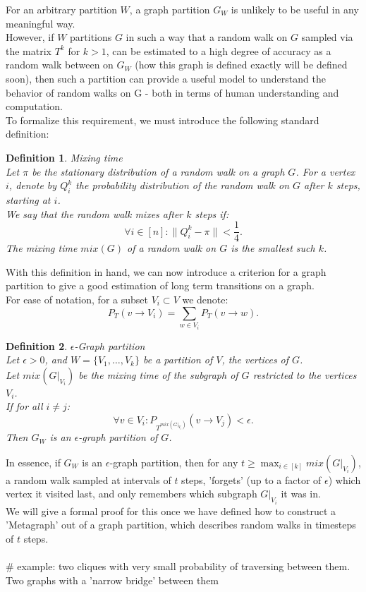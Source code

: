 \documentclass{article}
\newtheorem{definition}{Definition}
\begin{document}
For an arbitrary partition $W$, a graph partition $G_W$ is unlikely to be useful in any meaningful way. \\
However, if $W$ partitions $G$ in such a way that a random walk on $G$ sampled via the matrix $T^k$ for $k > 1$, can be estimated to a high degree of accuracy as a random walk between on $G_W$ (how this graph is defined exactly will be defined soon), then such a partition can provide a useful model to understand the behavior of random walks on G - both in terms of human understanding and computation.\\

To formalize this requirement, we must introduce the following standard definition:
\begin{definition}
    Mixing time\\
    Let $\pi$ be the stationary distribution of a random walk on a graph $G$. For a vertex $i$, denote by $Q_i^k$ the probability distribution of the random walk on $G$ after $k$ steps, starting at $i$.\\
    We say that the random walk mixes after $k$ steps if:
    \[
        \forall i \in [n] : \|Q_i^k - \pi\| < \frac{1}{4}
    .\] 
    The mixing time $mix(G)$ of a random walk on $G$ is the smallest such $k$.
\end{definition}

With this definition in hand, we can now introduce a criterion for a graph partition to give a good estimation of long term transitions on a graph.\\
For ease of notation, for a subset $V_i \subset V$ we denote:
\[
    P_{T}(v\rightarrow V_i) = \sum_{w\in V_i}P_{T}(v\rightarrow w)
.\] 
\begin{definition}
    $\epsilon$-Graph partition\\
Let $\epsilon>0$, and $W = \{V_1, \dots, V_k\}$ be a partition of $V$, the vertices of $G$.\\
Let $mix(G|_{V_i})$ be the mixing time of the subgraph of $G$ restricted to the vertices $V_i$.\\
If for all $i\neq j$:
\[
    \forall v\in V_i : P_{T^{mix(G|_{V_i})}}(v \rightarrow V_j) < \epsilon
.\] 
Then $G_{W}$ is an $\epsilon$-graph partition of $G$.
\end{definition}
In essence, if $G_{W}$ is an $\epsilon$-graph partition, then for any $t\geq \max_{i\in [k]}mix(G|_{V_i})$, a random walk sampled at intervals of $t$ steps, 'forgets' (up to a factor of $\epsilon$) which vertex it visited last, and only remembers which subgraph $G|_{V_i}$ it was in. \\
We will give a formal proof for this once we have defined how to construct a 'Metagraph' out of a graph partition, which describes random walks in timesteps of $t$ steps.
\\
\\
\# example: two cliques with very small probability of traversing between them. Two graphs with a 'narrow bridge' between them\\
\end{document}
